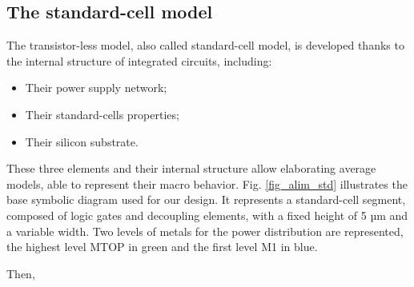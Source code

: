 \subsection{The standard-cell model}
The transistor-less model, also called standard-cell model, is developed thanks to the internal structure of integrated circuits, including:
\begin{itemize}
	\item Their power supply network;
	\item Their standard-cells properties;
	\item Their silicon substrate.
\end{itemize}
These three elements and their internal structure allow elaborating average models, able to represent their macro behavior.
Fig. \ref{fig_alim_std} illustrates the base symbolic diagram used for our design.
It represents a standard-cell segment, composed of logic gates and decoupling elements, with a fixed height of 5 µm and a variable width.
Two levels of metals for the power distribution are represented, the highest level MTOP in green and the first level M1 in blue.

Then, 

%







